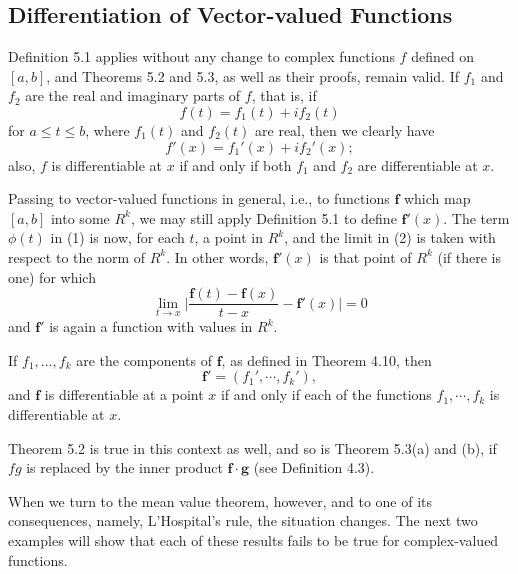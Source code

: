\documentclass[../poma-notes.tex]{subfiles}
\begin{document}
\subsection*{Differentiation of Vector-valued Functions}

\begin{remarks}
  Definition 5.1 applies without any change to complex functions $f$ defined on $[a,b]$, and Theorems 5.2 and 5.3,
  as well as their proofs, remain valid. If $f_1$ and $f_2$ are the real and imaginary parts of $f$, that is, if
  \[
    f(t) = f_1(t) + i f_2(t)
  \]
  for $a \le t \le b$, where $f_1(t)$ and $f_2(t)$ are real, then we clearly have
  \begin{equation}
    f'(x) = f_1'(x) + i f_2'(x);
  \end{equation}
  also, $f$ is differentiable at $x$ if and only if both $f_1$ and $f_2$ are differentiable at $x$.

  Passing to vector-valued functions in general, i.e., to functions $\mathbf{f}$ which map $[a,b]$ into some $R^k$,
  we may still apply Definition 5.1 to define $\mathbf{f}'(x)$. The term $\phi(t)$ in (1) is now, for each $t$,
  a point in $R^k$, and the limit in (2) is taken with respect to the norm of $R^k$. In other words, $\mathbf{f}'(x)$
  is that point of $R^k$ (if there is one) for which
  \begin{equation}
    \lim_{t\to x} \biggl| \frac{\mathbf{f}(t) - \mathbf{f}(x)}{t - x} - \mathbf{f}'(x) \biggr| = 0
  \end{equation}
  and $\mathbf{f}'$ is again a function with values in $R^k$.

  If $f_1,\dots,f_k$ are the components of $\mathbf{f}$, as defined in Theorem 4.10, then
  \begin{equation}
    \mathbf{f}' = (f_1',\cdots,f_k'),
  \end{equation}
  and $\mathbf{f}$ is differentiable at a point $x$ if and only if each of the functions $f_1,\cdots,f_k$ is
  differentiable at $x$.

  Theorem 5.2 is true in this context as well, and so is Theorem 5.3(a) and (b), if $fg$ is replaced by the inner
  product $\mathbf{f \cdot g}$ (see Definition 4.3).

  When we turn to the mean value theorem, however, and to one of its consequences, namely, L'Hospital's rule,
  the situation changes. The next two examples will show that each of these results fails to be true for
  complex-valued functions.
\end{remarks}
\end{document}
